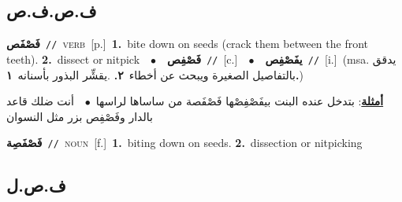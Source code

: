 \documentclass[10pt,a4paper,twoside]{article} %
\begin{document}
\begin{multicols}{2}
\vspace{-3mm}
\subsection*{\color{blue}\foreignlanguage{arabic}{ف.ص.ف.ص}\color{blue}{}} 

{\setlength\topsep{0pt}\textbf{\foreignlanguage{arabic}{فَصْفَص}}\ {\color{gray}\texttt{//}\color{black}}\ \textsc{verb}\ [p.]\ \textbf{1.}~bite down on seeds (crack them between the front teeth).  \textbf{2.}~dissect or nitpick\ \ $\bullet$\ \ \setlength\topsep{0pt}\textbf{\foreignlanguage{arabic}{فَصْفِص}}\ {\color{gray}\texttt{//}\color{black}}\ [c.]\ \ $\bullet$\ \ \setlength\topsep{0pt}\textbf{\foreignlanguage{arabic}{يفَصْفِص}}\ {\color{gray}\texttt{//}\color{black}}\ [i.]\ \color{gray}(msa. \foreignlanguage{arabic}{يدقق بالتفاصيل الصغيرة ويبحث عن أخطاء}~\foreignlanguage{arabic}{\textbf{٢.}}  .\foreignlanguage{arabic}{يقشِّر البذور بأسنانه}~\foreignlanguage{arabic}{\textbf{١.}})\color{black}\  \begin{flushright}\color{gray}\foreignlanguage{arabic}{\textbf{\underline{\foreignlanguage{arabic}{أمثلة}}}: بتدخل عنده البنت بيفَصْفِصْها فَصْفَصة من ساساها لراسها\ $\bullet$\ \  أنت ضلك قاعد بالدار وفَصْفِص بزر مثل النسوان}\end{flushright}\color{black}} \vspace{2mm}

{\setlength\topsep{0pt}\textbf{\foreignlanguage{arabic}{فَصْفَصِة}}\ {\color{gray}\texttt{//}\color{black}}\ \textsc{noun}\ [f.]\ \textbf{1.}~biting down on seeds.  \textbf{2.}~dissection or nitpicking\ } \vspace{2mm}

\vspace{-3mm}
\subsection*{\color{blue}\foreignlanguage{arabic}{ف.ص.ل}\color{blue}{}} 


\end{multicols}
\end{document}
